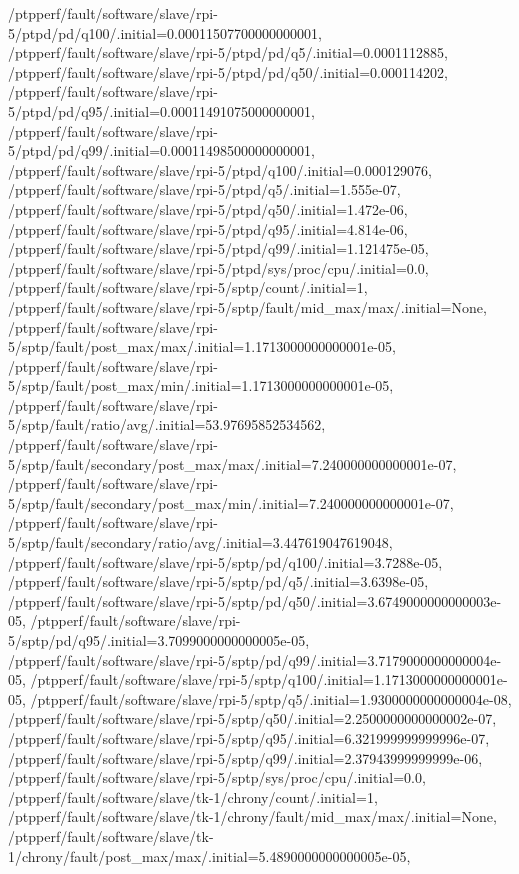 {    /ptpperf/fault/software/slave/rpi-5/ptpd/pd/q100/.initial=0.00011507700000000001,
    /ptpperf/fault/software/slave/rpi-5/ptpd/pd/q5/.initial=0.0001112885,
    /ptpperf/fault/software/slave/rpi-5/ptpd/pd/q50/.initial=0.000114202,
    /ptpperf/fault/software/slave/rpi-5/ptpd/pd/q95/.initial=0.00011491075000000001,
    /ptpperf/fault/software/slave/rpi-5/ptpd/pd/q99/.initial=0.00011498500000000001,
    /ptpperf/fault/software/slave/rpi-5/ptpd/q100/.initial=0.000129076,
    /ptpperf/fault/software/slave/rpi-5/ptpd/q5/.initial=1.555e-07,
    /ptpperf/fault/software/slave/rpi-5/ptpd/q50/.initial=1.472e-06,
    /ptpperf/fault/software/slave/rpi-5/ptpd/q95/.initial=4.814e-06,
    /ptpperf/fault/software/slave/rpi-5/ptpd/q99/.initial=1.121475e-05,
    /ptpperf/fault/software/slave/rpi-5/ptpd/sys/proc/cpu/.initial=0.0,
    /ptpperf/fault/software/slave/rpi-5/sptp/count/.initial=1,
    /ptpperf/fault/software/slave/rpi-5/sptp/fault/mid_max/max/.initial=None,
    /ptpperf/fault/software/slave/rpi-5/sptp/fault/post_max/max/.initial=1.1713000000000001e-05,
    /ptpperf/fault/software/slave/rpi-5/sptp/fault/post_max/min/.initial=1.1713000000000001e-05,
    /ptpperf/fault/software/slave/rpi-5/sptp/fault/ratio/avg/.initial=53.97695852534562,
    /ptpperf/fault/software/slave/rpi-5/sptp/fault/secondary/post_max/max/.initial=7.240000000000001e-07,
    /ptpperf/fault/software/slave/rpi-5/sptp/fault/secondary/post_max/min/.initial=7.240000000000001e-07,
    /ptpperf/fault/software/slave/rpi-5/sptp/fault/secondary/ratio/avg/.initial=3.447619047619048,
    /ptpperf/fault/software/slave/rpi-5/sptp/pd/q100/.initial=3.7288e-05,
    /ptpperf/fault/software/slave/rpi-5/sptp/pd/q5/.initial=3.6398e-05,
    /ptpperf/fault/software/slave/rpi-5/sptp/pd/q50/.initial=3.6749000000000003e-05,
    /ptpperf/fault/software/slave/rpi-5/sptp/pd/q95/.initial=3.7099000000000005e-05,
    /ptpperf/fault/software/slave/rpi-5/sptp/pd/q99/.initial=3.7179000000000004e-05,
    /ptpperf/fault/software/slave/rpi-5/sptp/q100/.initial=1.1713000000000001e-05,
    /ptpperf/fault/software/slave/rpi-5/sptp/q5/.initial=1.9300000000000004e-08,
    /ptpperf/fault/software/slave/rpi-5/sptp/q50/.initial=2.2500000000000002e-07,
    /ptpperf/fault/software/slave/rpi-5/sptp/q95/.initial=6.321999999999996e-07,
    /ptpperf/fault/software/slave/rpi-5/sptp/q99/.initial=2.37943999999999e-06,
    /ptpperf/fault/software/slave/rpi-5/sptp/sys/proc/cpu/.initial=0.0,
    /ptpperf/fault/software/slave/tk-1/chrony/count/.initial=1,
    /ptpperf/fault/software/slave/tk-1/chrony/fault/mid_max/max/.initial=None,
    /ptpperf/fault/software/slave/tk-1/chrony/fault/post_max/max/.initial=5.4890000000000005e-05,
}
